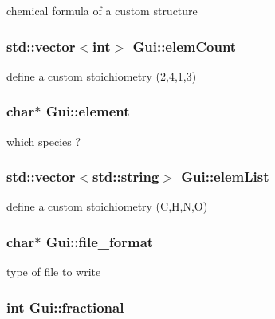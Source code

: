 chemical formula of a custom structure 

\hypertarget{class_gui_af3e1a1fb1647e26d6a8a41e051d7433b}{}
\subsubsection[{elem\+Count}]{\setlength{\rightskip}{0pt plus 5cm}std\+::vector$<$int$>$ Gui\+::elem\+Count}\label{class_gui_af3e1a1fb1647e26d6a8a41e051d7433b}


define a custom stoichiometry (2,4,1,3) 

\hypertarget{class_gui_a2cb3d0d19735c9b7c0acaab6a236eb17}{}
\subsubsection[{element}]{\setlength{\rightskip}{0pt plus 5cm}char$\ast$ Gui\+::element}\label{class_gui_a2cb3d0d19735c9b7c0acaab6a236eb17}


which species ? 

\hypertarget{class_gui_a33f327cf44f8231253a244d582cc7a9c}{}
\subsubsection[{elem\+List}]{\setlength{\rightskip}{0pt plus 5cm}std\+::vector$<$std\+::string$>$ Gui\+::elem\+List}\label{class_gui_a33f327cf44f8231253a244d582cc7a9c}


define a custom stoichiometry (C,H,N,O) 

\hypertarget{class_gui_afe858ad21a3a036632416f887fe06d37}{}
\subsubsection[{file\+\_\+format}]{\setlength{\rightskip}{0pt plus 5cm}char$\ast$ Gui\+::file\+\_\+format}\label{class_gui_afe858ad21a3a036632416f887fe06d37}


type of file to write 

\hypertarget{class_gui_a7b7337d99ba2860adbe3ab2e48d35338}{}
\subsubsection[{fractional}]{\setlength{\rightskip}{0pt plus 5cm}int Gui\+::fractional}\label{class_gui_a7b7337d99ba2860adbe3ab2e48d35338}


